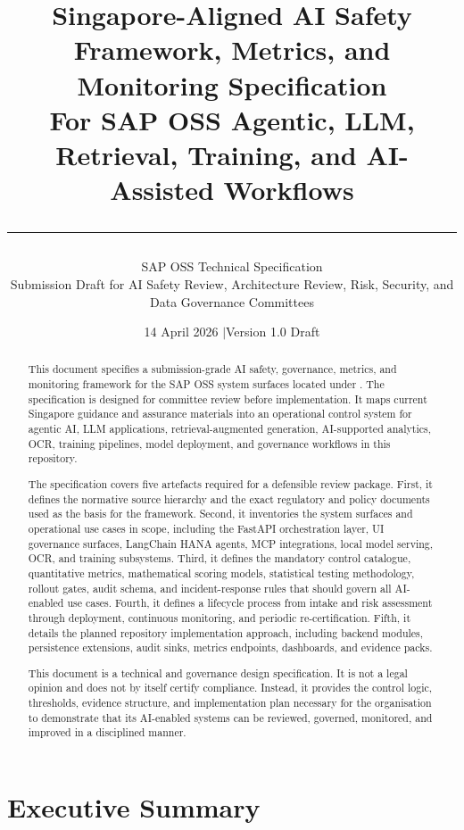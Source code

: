 \documentclass[11pt,a4paper]{article}
\title{
    \vspace{-1cm}
    {\LARGE\bfseries Singapore-Aligned AI Safety Framework, Metrics, and Monitoring Specification}\\[0.35cm]
    {\Large For SAP OSS Agentic, LLM, Retrieval, Training, and AI-Assisted Workflows}\\[0.5cm]
    \rule{\textwidth}{1pt}
}
\author{
    SAP OSS Technical Specification\\
    \small Submission Draft for AI Safety Review, Architecture Review, Risk, Security, and Data Governance Committees
}
\date{14 April 2026 \quad$\mid$\quad Version 1.0 Draft}
\begin{document}
\maketitle
\thispagestyle{empty}

\begin{abstract}
\noindent
This document specifies a submission-grade AI safety, governance, metrics, and monitoring framework for the SAP OSS system surfaces located under . The specification is designed for committee review before implementation. It maps current Singapore guidance and assurance materials into an operational control system for agentic AI, LLM applications, retrieval-augmented generation, AI-supported analytics, OCR, training pipelines, model deployment, and governance workflows in this repository.

The specification covers five artefacts required for a defensible review package. First, it defines the normative source hierarchy and the exact regulatory and policy documents used as the basis for the framework. Second, it inventories the system surfaces and operational use cases in scope, including the FastAPI orchestration layer, UI governance surfaces, LangChain HANA agents, MCP integrations, local model serving, OCR, and training subsystems. Third, it defines the mandatory control catalogue, quantitative metrics, mathematical scoring models, statistical testing methodology, rollout gates, audit schema, and incident-response rules that should govern all AI-enabled use cases. Fourth, it defines a lifecycle process from intake and risk assessment through deployment, continuous monitoring, and periodic re-certification. Fifth, it details the planned repository implementation approach, including backend modules, persistence extensions, audit sinks, metrics endpoints, dashboards, and evidence packs.

This document is a technical and governance design specification. It is not a legal opinion and does not by itself certify compliance. Instead, it provides the control logic, thresholds, evidence structure, and implementation plan necessary for the organisation to demonstrate that its AI-enabled systems can be reviewed, governed, monitored, and improved in a disciplined manner.
\end{abstract}

\tableofcontents
\newpage

\section{Executive Summary}
\end{document}
